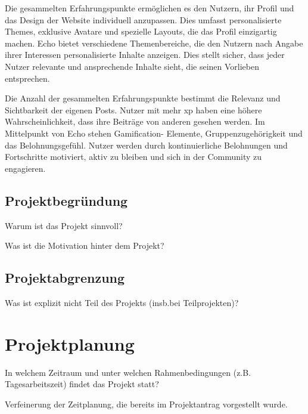 \documentclass[a4paper,12pt]{article}
\begin{document}
Die gesammelten Erfahrungspunkte ermöglichen es den Nutzern, ihr Profil und das
Design der Website individuell anzupassen. Dies umfasst personalisierte Themes,
exklusive Avatare und spezielle Layouts, die das Profil einzigartig machen.
Echo bietet verschiedene Themenbereiche, die den Nutzern nach Angabe ihrer
Interessen personalisierte Inhalte anzeigen. Dies stellt sicher, dass jeder
Nutzer relevante und ansprechende Inhalte sieht, die seinen Vorlieben
entsprechen.

Die Anzahl der gesammelten Erfahrungspunkte bestimmt die Relevanz und
Sichtbarkeit der eigenen Posts. Nutzer mit mehr \gls{xp} haben eine höhere
Wahrscheinlichkeit, dass ihre Beiträge von anderen gesehen werden. Im
Mittelpunkt von Echo stehen Gamification- Elemente, Gruppenzugehörigkeit und
das Belohnungsgefühl. Nutzer werden durch kontinuierliche Belohnungen und
Fortschritte motiviert, aktiv zu bleiben und sich in der Community zu
engagieren.

\subsection{Projektbegründung}
Warum ist das Projekt sinnvoll?

Was ist die Motivation hinter dem Projekt?

\subsection{Projektabgrenzung}
Was ist explizit nicht Teil des Projekts (insb.bei Teilprojekten)?

\newpage \section{Projektplanung}
In welchem Zeitraum und unter welchen
Rahmenbedingungen (z.B. Tagesarbeitszeit) findet das Projekt statt?

Verfeinerung der Zeitplanung, die bereits im Projektantrag vorgestellt wurde.
\end{document}
